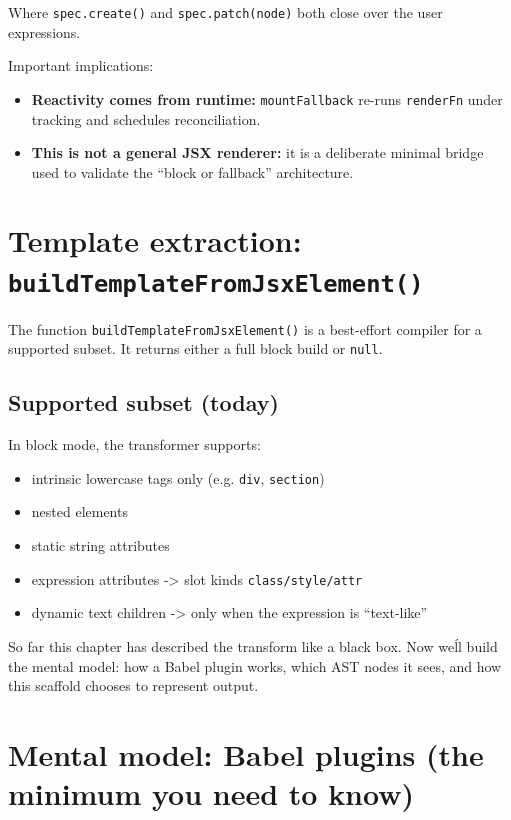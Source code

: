 Where \texttt{spec.create()} and \texttt{spec.patch(node)} both close over the user expressions.

Important implications:

\begin{itemize}
\item \textbf{Reactivity comes from runtime:} \texttt{mountFallback} re-runs \texttt{renderFn} under tracking and schedules reconciliation.
\item \textbf{This is not a general JSX renderer:} it is a deliberate minimal bridge used to validate the ``block or fallback'' architecture.
\end{itemize}

\section{Template extraction: \texttt{buildTemplateFromJsxElement()}}

The function \texttt{buildTemplateFromJsxElement()} is a best-effort compiler for a supported subset.
It returns either a full block build or \texttt{null}.

\subsection{Supported subset (today)}

In block mode, the transformer supports:

\begin{itemize}
\item intrinsic lowercase tags only (e.g. \texttt{div}, \texttt{section})
\item nested elements
\item static string attributes
\item expression attributes -> slot kinds \texttt{class/style/attr}
\item dynamic text children -> only when the expression is ``text-like''
\end{itemize}

So far this chapter has described the transform like a black box.
Now we\'ll build the mental model: how a Babel plugin works, which AST nodes it sees, and how this scaffold chooses to represent output.

\section{Mental model: Babel plugins (the minimum you need to know)}

